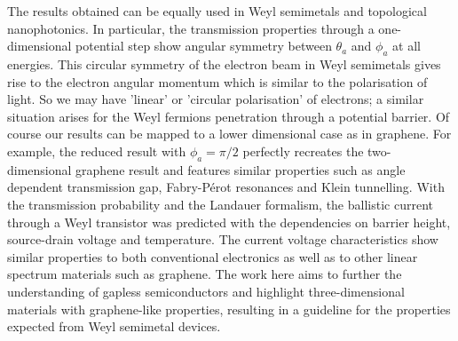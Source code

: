 \documentclass[prb,twocolumn,aps,superscriptaddress,showpacs,floatfix]{revtex4}
\begin{document}
	The results obtained can be equally used in Weyl semimetals and topological nanophotonics. In particular, the transmission properties through a one-dimensional potential step show angular symmetry between $\theta_{a}$ and $\phi_{a}$ at all energies. This circular symmetry of the electron beam in Weyl semimetals gives rise to the electron angular momentum which is similar to the polarisation of light. So we may have 'linear' or 'circular polarisation' of electrons; a similar situation arises for the Weyl fermions penetration through a potential barrier. Of course our results can be mapped to a lower dimensional case as in graphene.  For example, the reduced result with $\phi_{a}=\pi/2$ perfectly recreates the two-dimensional graphene result and features similar properties such as angle dependent transmission gap, Fabry-P\'{e}rot resonances and Klein tunnelling. With the transmission probability and the Landauer formalism, the ballistic current through a Weyl transistor was predicted with the dependencies on barrier height, source-drain voltage and temperature. The current voltage characteristics show similar properties to both conventional electronics as well as to other linear spectrum materials such as graphene. The work here aims to further the understanding of gapless semiconductors and highlight three-dimensional materials with graphene-like properties, resulting in a guideline for the properties expected from Weyl semimetal devices.
\end{document}
